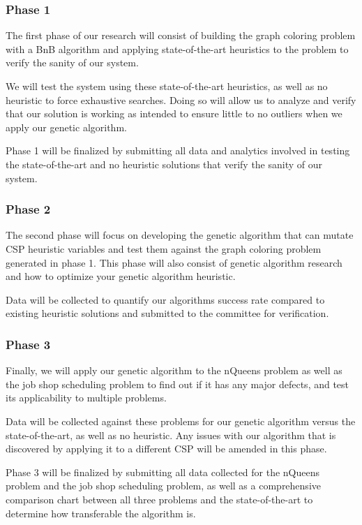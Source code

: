 \documentclass[10pt,twoside]{IEEEtran}
\begin{document}
\subsubsection{Phase 1}
The first phase of our research will consist of building the graph coloring problem with a BnB algorithm and applying state-of-the-art heuristics to the problem to verify the sanity of our system.

We will test the system using these state-of-the-art heuristics, as well as no heuristic to force exhaustive searches. Doing so will allow us to analyze and verify that our solution is working as intended to ensure little to no outliers when we apply our genetic algorithm.

Phase 1 will be finalized by submitting all data and analytics involved in testing the state-of-the-art and no heuristic solutions that verify the sanity of our system.

\subsubsection{Phase 2}
The second phase will focus on developing the genetic algorithm that can mutate CSP heuristic variables and test them against the graph coloring problem generated in phase 1. This phase will also consist of genetic algorithm research and how to optimize your genetic algorithm heuristic.

Data will be collected to quantify our algorithms success rate compared to existing heuristic solutions and submitted to the committee for verification.

\subsubsection{Phase 3}
Finally, we will apply our genetic algorithm to the nQueens problem as well as the job shop scheduling problem to find out if it has any major defects, and test its applicability to multiple problems. 

Data will be collected against these problems for our genetic algorithm versus the state-of-the-art, as well as no heuristic. Any issues with our algorithm that is discovered by applying it to a different CSP will be amended in this phase.

Phase 3 will be finalized by submitting all data collected for the nQueens problem and the job shop scheduling problem, as well as a comprehensive comparison chart between all three problems and the state-of-the-art to determine how transferable the algorithm is.
\end{document}
